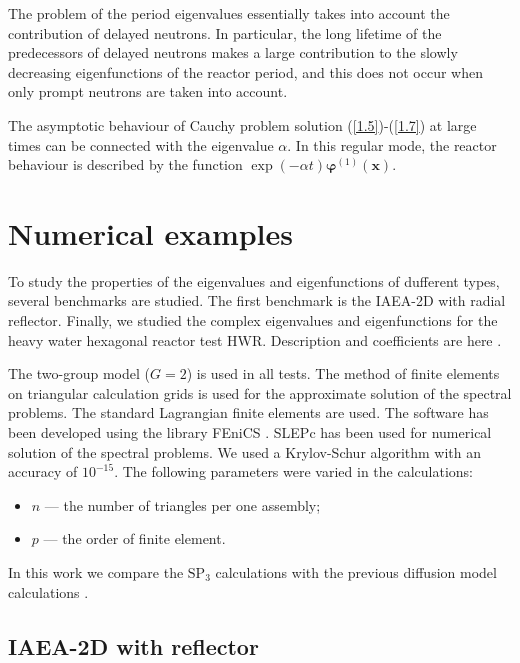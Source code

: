 \documentclass[a4paper]{jpconf}
\begin{document}
The problem of the period eigenvalues essentially takes into account the contribution of delayed neutrons.
In particular, the long lifetime of the predecessors of delayed neutrons makes a large contribution to the slowly decreasing eigenfunctions of the reactor period, and this does not occur when only prompt neutrons are taken into account.

The asymptotic behaviour of Cauchy problem solution (\ref{1.5})-(\ref{1.7}) at large times can be connected with the eigenvalue $\alpha$.
In this regular mode, the reactor behaviour is described by the function $\exp(-\alpha t) \bm \varphi^{(1)}(\bm x)$.

\section{Numerical examples}
To study the properties of the eigenvalues and eigenfunctions of dufferent types, several benchmarks are studied.
The first benchmark is the IAEA-2D with radial reflector.
Finally, we studied the complex eigenvalues and eigenfunctions for the heavy water hexagonal reactor test HWR. Description and coefficients are here \cite{chao1995}.

The two-group model ($G = 2$) is used in all tests. 
The method of finite elements \cite{brenner2008} on triangular calculation grids is used for the approximate solution of the spectral problems. 
The standard Lagrangian finite elements are used.
The software has been developed using the library FEniCS \cite{logg2012}.
SLEPc has been used for numerical solution of the spectral problems.
We used a Krylov-Schur algorithm with an accuracy of $10^{-15}$.
The following parameters were varied in the calculations:
\begin{itemize}\itemsep1pt \parskip0pt 
\item $n$ --- the number of triangles per one assembly; 
\item $p$ --- the order of finite element.
\end{itemize}
In this work we compare the $\mathrm{SP_3}$ calculations with the previous diffusion model calculations \cite{avvakumov2014, avvakumov2017spectral}.

\subsection{IAEA-2D with reflector}
\end{document}
